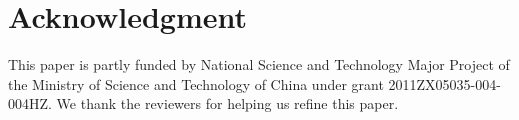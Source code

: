 \documentclass[conference]{IEEEtran}
\theoremstyle{definition}
\theoremstyle{definition}
\begin{document}


\section*{Acknowledgment}
This paper is partly funded by National Science and Technology Major Project of the Ministry of Science and Technology of China under grant 2011ZX05035-004-004HZ.
We  thank the  reviewers for helping us refine this paper. 




%
%
%




\iffalse
\end{document}
